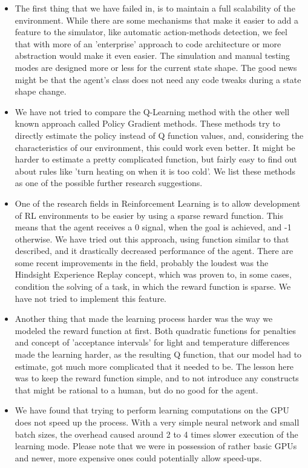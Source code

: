 \documentclass{article}
\begin{document}
\begin{itemize}
\item The first thing that we have failed in, is to maintain a full scalability of the environment. While there are some mechanisms that make it easier to add a feature to the simulator, like automatic action-methods detection, we feel that with more of an 'enterprise' approach to code architecture or more abstraction would make it even easier. The simulation and manual testing modes are designed more or less for the current state shape. The good news might be that the agent's class does not need any code tweaks during a state shape change.

\item We have not tried to compare the Q-Learning method with the other well known approach called Policy Gradient methods. These methods try to directly estimate the policy instead of Q function values, and, considering the characteristics of our environment, this could work even better. It might be harder to estimate a pretty complicated function, but fairly easy to find out about rules like 'turn heating on when it is too cold'. We list these methods as one of the possible further research suggestions.

\item One of the research fields in Reinforcement Learning is to allow development of RL environments to be easier by using a sparse reward function. This means that the agent receives a 0 signal, when the goal is achieved, and -1 otherwise. We have tried out this approach, using function similar to that described, and it drastically decreased performance of the agent. There are some recent improvements in the field, probably the loudest was the Hindsight Experience Replay concept, which was proven to, in some cases, condition the solving of a task, in which the reward function is sparse. We have not tried to implement this feature.

\item Another thing that made the learning process harder was the way we modeled the reward function at first. Both quadratic functions for penalties and concept of 'acceptance intervals' for light and temperature differences made the learning harder, as the resulting Q function, that our model had to estimate, got much more complicated that it needed to be. The lesson here was to keep the reward function simple, and to not introduce any constructs that might be rational to a human, but do no good for the agent. 

\item We have found that trying to perform learning computations on the GPU does not speed up the process. With a very simple neural network and small batch sizes, the overhead caused around 2 to 4 times slower execution of the learning mode. Please note that we were in possession of rather basic GPUs and newer, more expensive ones could potentially allow speed-ups.


\end{itemize}
\end{document}
